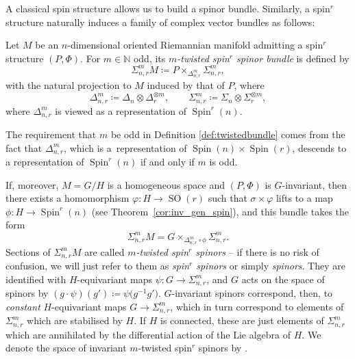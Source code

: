 \documentclass[pdftex]{sigma}
\numberwithin{equation}{section}
\newcommand{\N}{\mathbb{N}} %
\DeclareMathOperator{\SO}{SO}
\DeclareMathOperator{\Spin}{Spin}
\begin{document}
		A classical spin structure allows us to build a spinor bundle. Similarly, a spin$^r$ structure naturally induces a family of complex vector bundles as follows:
		\begin{Definition}\label{def:twistedbundle}
			Let $M$ be an $n$-dimensional oriented Riemannian manifold admitting a spin$^r$ structure $(P,\Phi)$. For $m \in \N$ odd, its \textit{$m$-twisted spin$^r$ spinor bundle} is defined by
			\[ \Sigma_{n,r}^m M \coloneqq P \times_{\Delta_{n,r}^{m}} \Sigma_{n,r}^{m} , \]
			with the natural projection to $M$ induced by that of $P$, where
			\[ \Delta_{n,r}^{m} \coloneqq \Delta_n \otimes \Delta_{r}^{\otimes m} , \qquad \Sigma_{n,r}^{m} \coloneqq \Sigma_n \otimes \Sigma_{r}^{\otimes m} , \]
			where $\Delta_{n,r}^{m}$ is viewed as a representation of $\Spin^r(n)$.
		\end{Definition}
		The requirement that $m$ be odd in Definition \ref{def:twistedbundle} comes from the fact that $\Delta_{n,r}^{m}$, which is a~representation of $\Spin(n) \times \Spin(r)$, descends to a representation of $\Spin^r(n)$ if and only if $m$ is odd.
		
		If, moreover, $M = G/H$ is a homogeneous space and $(P,\Phi)$ is $G$-invariant, then there exists a homomorphism $\varphi \colon H \to \SO(r)$ such that $\sigma \times \varphi$ lifts to a map $\phi \colon H \to \Spin^r(n)$ (see Theorem~\ref{cor:inv_gen_spin}), and this bundle takes the form
		\[ \Sigma_{n,r}^m M = G \times_{\Delta_{n,r}^{m} \circ \phi} \Sigma_{n,r}^{m} . \]
		Sections of $\Sigma_{n,r}^m M$ are called \textit{$m$-twisted spin$^r$ spinors} -- if there is no risk of confusion, we will just refer to them as \textit{spin$^r$ spinors} or simply \textit{spinors}. They are identified with $H$-equivariant maps $\psi \colon G \to \Sigma_{n,r}^{m}$, and $G$ acts on the space of spinors by
$
		(g \cdot \psi ) (g') \coloneqq \psi \bigl( g^{-1} g' \bigr)$.
		$G$-invariant spinors correspond, then, to \textit{constant} $H$-equivariant maps $G \to \Sigma_{n,r}^{m}$, which in turn correspond to elements of $\Sigma_{n,r}^{m}$ which are stabilised by $H$. If $H$ is connected, these are just elements of $\Sigma_{n,r}^{m}$ which are annihilated by the differential action of the Lie algebra of $H$. We denote the space of invariant $m$-twisted spin$^r$ spinors by .
		
\end{document}
